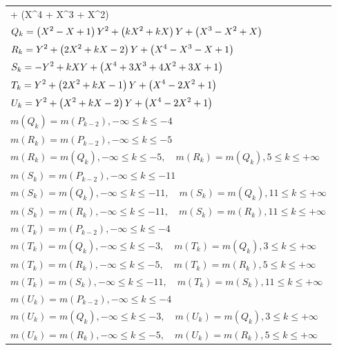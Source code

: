 \documentclass{amsart}
\begin{document}
\begin{longtable}{|l|}
 + \left(X^4
 + X^3
 + X^2\right) \)\\
\(\displaystyle Q_k= \left(X^2
 - X
 + 1\right) \*Y^2
 + \left(k\*X^2
 + k\*X\right) \*Y
 + \left(X^3
 - X^2
 + X\right) \)\\
\(\displaystyle R_k=Y^2
 + \left(2\*X^2
 + k\*X
 - 2\right) \*Y
 + \left(X^4
 - X^3
 - X
 + 1\right) \)\\
\(\displaystyle S_k=-Y^2
 + k\*X\*Y
 + \left(X^4
 + 3\*X^3
 + 4\*X^2
 + 3\*X
 + 1\right) \)\\
\(\displaystyle T_k=Y^2
 + \left(2\*X^2
 + k\*X
 - 1\right) \*Y
 + \left(X^4
 - 2\*X^2
 + 1\right) \)\\
\(\displaystyle U_k=Y^2
 + \left(X^2
 + k\*X
 - 2\right) \*Y
 + \left(X^4
 - 2\*X^2
 + 1\right) \)\\
\(\displaystyle m(Q_k) = m(P_{k
 - 2}),-\infty \leqslant k \leqslant -4\)\\
\(\displaystyle m(R_k) = m(P_{k
 - 2}),-\infty \leqslant k \leqslant -5\)\\
\(\displaystyle m(R_k) = m(Q_{k}),-\infty \leqslant k \leqslant -5,\quad m(R_k) = m(Q_{k}),5 \leqslant k \leqslant +\infty\)\\
\(\displaystyle m(S_k) = m(P_{k
 - 2}),-\infty \leqslant k \leqslant -11\)\\
\(\displaystyle m(S_k) = m(Q_{k}),-\infty \leqslant k \leqslant -11,\quad m(S_k) = m(Q_{k}),11 \leqslant k \leqslant +\infty\)\\
\(\displaystyle m(S_k) = m(R_{k}),-\infty \leqslant k \leqslant -11,\quad m(S_k) = m(R_{k}),11 \leqslant k \leqslant +\infty\)\\
\(\displaystyle m(T_k) = m(P_{k
 - 2}),-\infty \leqslant k \leqslant -4\)\\
\(\displaystyle m(T_k) = m(Q_{k}),-\infty \leqslant k \leqslant -3,\quad m(T_k) = m(Q_{k}),3 \leqslant k \leqslant +\infty\)\\
\(\displaystyle m(T_k) = m(R_{k}),-\infty \leqslant k \leqslant -5,\quad m(T_k) = m(R_{k}),5 \leqslant k \leqslant +\infty\)\\
\(\displaystyle m(T_k) = m(S_{k}),-\infty \leqslant k \leqslant -11,\quad m(T_k) = m(S_{k}),11 \leqslant k \leqslant +\infty\)\\
\(\displaystyle m(U_k) = m(P_{k
 - 2}),-\infty \leqslant k \leqslant -4\)\\
\(\displaystyle m(U_k) = m(Q_{k}),-\infty \leqslant k \leqslant -3,\quad m(U_k) = m(Q_{k}),3 \leqslant k \leqslant +\infty\)\\
\(\displaystyle m(U_k) = m(R_{k}),-\infty \leqslant k \leqslant -5,\quad m(U_k) = m(R_{k}),5 \leqslant k \leqslant +\infty\)\\

\end{longtable}
\end{document}
